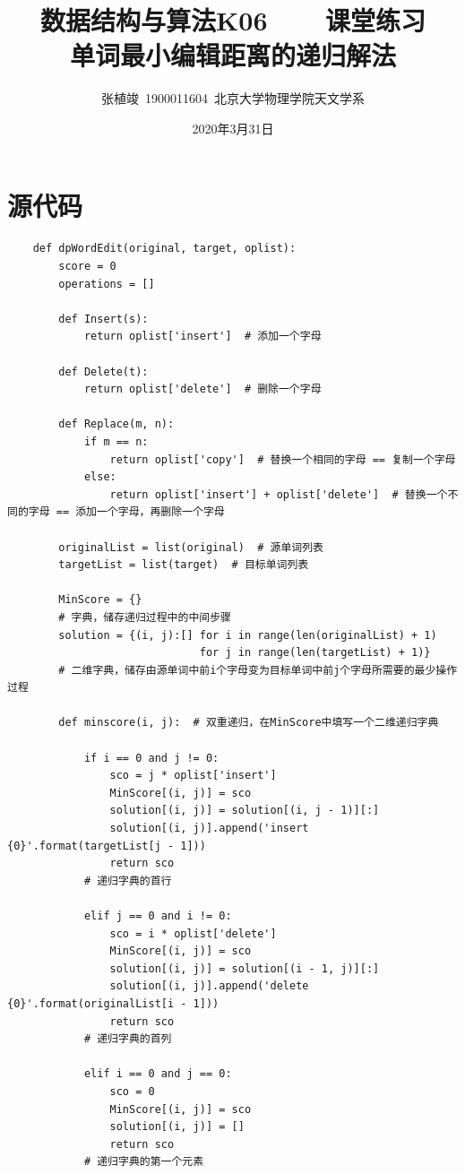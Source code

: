\documentclass[a4paper,fontset=windows]{ctexart}
\begin{document}
	
	\title{\textbf{数据结构与算法K06\ \ \ \ 课堂练习\\\vspace{1ex}单词最小编辑距离的递归解法}}
	\author{张植竣\ 1900011604\ 北京大学物理学院天文学系}
	\date{2020年3月31日}
	
	\maketitle
	
	\section*{源代码}

	\begin{lstlisting}
	def dpWordEdit(original, target, oplist):
		score = 0
		operations = []
		
		def Insert(s):
			return oplist['insert']  # 添加一个字母
		
		def Delete(t):
			return oplist['delete']  # 删除一个字母
		
		def Replace(m, n):
			if m == n:
				return oplist['copy']  # 替换一个相同的字母 == 复制一个字母
			else:
				return oplist['insert'] + oplist['delete']  # 替换一个不同的字母 == 添加一个字母，再删除一个字母
		
		originalList = list(original)  # 源单词列表
		targetList = list(target)  # 目标单词列表
		
		MinScore = {}
		# 字典，储存递归过程中的中间步骤
		solution = {(i, j):[] for i in range(len(originalList) + 1)
							  for j in range(len(targetList) + 1)}
		# 二维字典，储存由源单词中前i个字母变为目标单词中前j个字母所需要的最少操作过程
		
		def minscore(i, j):  # 双重递归，在MinScore中填写一个二维递归字典
		
			if i == 0 and j != 0:
				sco = j * oplist['insert']
				MinScore[(i, j)] = sco
				solution[(i, j)] = solution[(i, j - 1)][:]
				solution[(i, j)].append('insert {0}'.format(targetList[j - 1]))
				return sco
			# 递归字典的首行
		
			elif j == 0 and i != 0:
				sco = i * oplist['delete']
				MinScore[(i, j)] = sco
				solution[(i, j)] = solution[(i - 1, j)][:]
				solution[(i, j)].append('delete {0}'.format(originalList[i - 1]))
				return sco
			# 递归字典的首列
		
			elif i == 0 and j == 0:
				sco = 0
				MinScore[(i, j)] = sco
				solution[(i, j)] = []
				return sco
			# 递归字典的第一个元素
			

\end{lstlisting}
\end{document}
